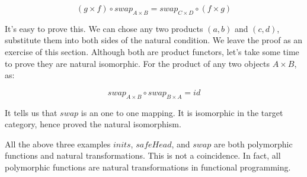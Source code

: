 \documentclass[b5paper]{article}
\begin{document}

\[
(g \times f) \circ swap_{A \times B} = swap_{C \times D} \circ (f \times g)
\]

\begin{center}
\end{center}

It's easy to prove this. We can chose any two products $(a, b)$ and $(c, d)$, substitute them into both sides of the natural condition. We leave the proof as an exercise of this section. Although both are product functors, let's take some time to prove they are natural isomorphic. For the product of any two objects $A \times B$, as:

\[
swap_{A \times B} \circ swap_{B \times A} = id
\]

It tells us that $swap$ is an one to one mapping. It is isomorphic in the target category, hence proved the natural isomorphism.

All the above three examples $inits$, $safeHead$, and $swap$ are both polymorphic functions and natural transformations. This is not a coincidence. In fact, all polymorphic functions are natural transformations in functional programming\cite{Wadler-1989}.

\begin{Exercise}\label{ex:nature-transform}
\end{Exercise}
\end{document}

